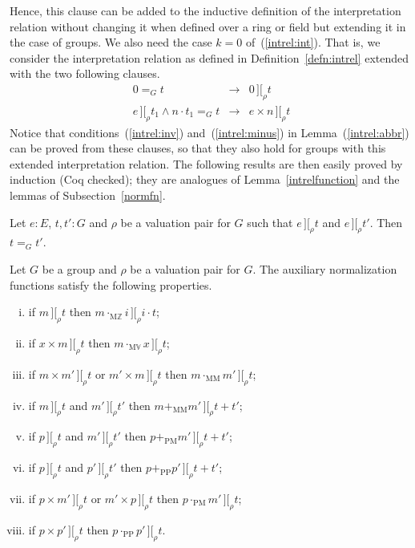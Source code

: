 \documentclass[numreferences]{kluwer}
\newcommand{\intII}{\,]\![}
\newcommand{\intrel}{\mathbin{\intII_{\rho}}}
\newcommand{\Z}{{\mathbb Z}}
\newcommand{\V}{{\mathbb V}}
\newcommand{\iter}[2]{\ensuremath{{#1}\cdot{#2}}}
\newcommand{\multMZ}{\ensuremath{\cdot_{\mathrm M\Z}}}
\newcommand{\multMV}{\ensuremath{\cdot_{\mathrm M\V}}}
\newcommand{\multMM}{\ensuremath{\cdot_{\mathrm{MM}}}}
\newcommand{\plusMM}{\ensuremath{+_{\mathrm{MM}}}}
\newcommand{\plusPM}{\ensuremath{+_{\mathrm{PM}}}}
\newcommand{\plusPP}{\ensuremath{+_{\mathrm{PP}}}}
\newcommand{\multPM}{\ensuremath{\cdot_{\mathrm{PM}}}}
\newcommand{\multPP}{\ensuremath{\cdot_{\mathrm{PP}}}}
\begin{document}
\begin{article}
Hence, this clause can be added to the inductive definition of
the interpretation relation without changing it when defined over a
ring or field but extending it in the case of groups.
We also need the case $k=0$ of~(\ref{intrel:int}).  That is, we
consider the interpretation relation as defined in
Definition~\ref{defn:intrel} extended with the two following clauses.
\begin{eqnarray}
\label{intrel:zero}
0=_G t & \rightarrow & 0\intrel t\\
\label{intrel:iter}
e\intrel t_1 \wedge \iter n{t_1}=_G t & \rightarrow & e\times n\intrel t
\end{eqnarray}
Notice that conditions~(\ref{intrel:inv}) and~(\ref{intrel:minus}) in
Lemma~(\ref{intrel:abbr}) can be proved from these clauses, so that
they also hold for groups with this extended interpretation relation.
The following results are then easily proved by induction (Coq checked);
they are analogues of Lemma~\ref{intrelfunction} and the lemmas of
Subsection~\ref{normfn}.

\begin{lemma}\label{intrelfunction:group} Let $e:E$, $t,t':G$ and $\rho$ be
a valuation pair for $G$ such that $e\intrel t$ and $e\intrel t'$.
Then $t=_G t'$.
\end{lemma}

\begin{lemma}\label{groupprops}
Let $G$ be a group and $\rho$ be a valuation pair for $G$.
The auxiliary normalization functions satisfy the following properties.
\begin{enumerate}[(i)]
\item if $m\intrel t$ then $m\multMZ i\intrel\iter it$;
\item if $x\times m\intrel t$ then $m\multMV x\intrel t$;
\item if $m\times m'\intrel t$ or $m'\times m\intrel t$ then
$m\multMM m'\intrel t$;
\item if $m\intrel t$ and $m'\intrel t'$ then $m\plusMM m'\intrel t+t'$;
\item if $p\intrel t$ and $m'\intrel t'$ then $p\plusPM m'\intrel t+t'$;
\item if $p\intrel t$ and $p'\intrel t'$ then $p\plusPP p'\intrel t+t'$;
\item if $p\times m'\intrel t$ or $m'\times p\intrel t$ then
$p\multPM m'\intrel t$;
\item if $p\times p'\intrel t$ then $p\multPP p'\intrel t$.
\end{enumerate}
\end{lemma}


\end{article}
\end{document}
